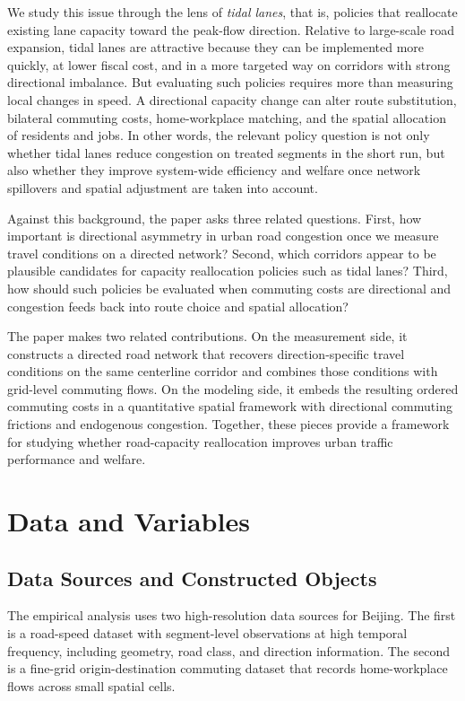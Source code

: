 \documentclass[12pt]{article}
\begin{document}
We study this issue through the lens of \emph{tidal lanes}, that is, policies that reallocate existing lane capacity toward the peak-flow direction. Relative to large-scale road expansion, tidal lanes are attractive because they can be implemented more quickly, at lower fiscal cost, and in a more targeted way on corridors with strong directional imbalance. But evaluating such policies requires more than measuring local changes in speed. A directional capacity change can alter route substitution, bilateral commuting costs, home-workplace matching, and the spatial allocation of residents and jobs. In other words, the relevant policy question is not only whether tidal lanes reduce congestion on treated segments in the short run, but also whether they improve system-wide efficiency and welfare once network spillovers and spatial adjustment are taken into account.

Against this background, the paper asks three related questions. First, how important is directional asymmetry in urban road congestion once we measure travel conditions on a directed network? Second, which corridors appear to be plausible candidates for capacity reallocation policies such as tidal lanes? Third, how should such policies be evaluated when commuting costs are directional and congestion feeds back into route choice and spatial allocation?

The paper makes two related contributions. On the measurement side, it constructs a directed road network that recovers direction-specific travel conditions on the same centerline corridor and combines those conditions with grid-level commuting flows. On the modeling side, it embeds the resulting ordered commuting costs in a quantitative spatial framework with directional commuting frictions and endogenous congestion. Together, these pieces provide a framework for studying whether road-capacity reallocation improves urban traffic performance and welfare.

\section{Data and Variables}
\subsection{Data Sources and Constructed Objects}
The empirical analysis uses two high-resolution data sources for Beijing. The first is a road-speed dataset with segment-level observations at high temporal frequency, including geometry, road class, and direction information. The second is a fine-grid origin-destination commuting dataset that records home-workplace flows across small spatial cells.
\end{document}
